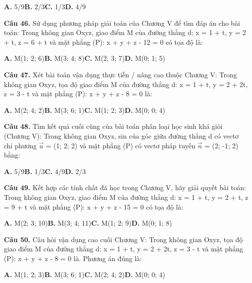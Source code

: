 \documentclass[11pt,a4paper]{article}
\begin{document}
\hspace*{1.5em}\textbf{A.} 5/9\quad\quad \textbf{B.} 2/3\quad\quad \textbf{C.} 1/3\quad\quad \textbf{D.} 4/9\par\vspace{2pt}
\textbf{\color{primary} Câu 46.} Sử dụng phương pháp giải toán của Chương V để tìm đáp án cho bài toán: Trong không gian Oxyz, giao điểm M của đường thẳng d: x = 1 + t, y = 2 + t, z = 6 + t và mặt phẳng (P): x + y + z - 12 = 0 có tọa độ là:\par
\hspace*{1.5em}\textbf{A.} M(1; 2; 6)\quad\quad \textbf{B.} M(3; 4; 8)\quad\quad \textbf{C.} M(2; 3; 7)\quad\quad \textbf{D.} M(0; 1; 5)\par\vspace{2pt}
\textbf{\color{primary} Câu 47.} Xét bài toán vận dụng thực tiễn / nâng cao thuộc Chương V: Trong không gian Oxyz, tọa độ giao điểm M của đường thẳng d: x = 1 + t, y = 2 + 2t, z = 3 - t và mặt phẳng (P): x + y + z - 8 = 0 là:\par
\hspace*{1.5em}\textbf{A.} M(2; 4; 2)\quad\quad \textbf{B.} M(3; 6; 1)\quad\quad \textbf{C.} M(1; 2; 3)\quad\quad \textbf{D.} M(0; 0; 4)\par\vspace{2pt}
\textbf{\color{primary} Câu 48.} Tìm kết quả cuối cùng của bài toán phân loại học sinh khá giỏi (Chương V): Trong không gian Oxyz, sin của góc giữa đường thẳng d có vectơ chỉ phương $\vec{u}$ = (1; 2; 2) và mặt phẳng (P) có vectơ pháp tuyến $\vec{n}$ = (2; -1; 2) bằng:\par
\hspace*{1.5em}\textbf{A.} 5/9\quad\quad \textbf{B.} 1/3\quad\quad \textbf{C.} 4/9\quad\quad \textbf{D.} 2/3\par\vspace{2pt}
\textbf{\color{primary} Câu 49.} Kết hợp các tính chất đã học trong Chương V, hãy giải quyết bài toán: Trong không gian Oxyz, giao điểm M của đường thẳng d: x = 1 + t, y = 2 + t, z = 9 + t và mặt phẳng (P): x + y + z - 15 = 0 có tọa độ là:\par
\hspace*{1.5em}\textbf{A.} M(2; 3; 10)\quad\quad \textbf{B.} M(3; 4; 11)\quad\quad \textbf{C.} M(1; 2; 9)\quad\quad \textbf{D.} M(0; 1; 8)\par\vspace{2pt}
\textbf{\color{primary} Câu 50.} Câu hỏi vận dụng cao cuối Chương V: Trong không gian Oxyz, tọa độ giao điểm M của đường thẳng d: x = 1 + t, y = 2 + 2t, z = 3 - t và mặt phẳng (P): x + y + z - 8 = 0 là. Phương án đúng là:\par
\hspace*{1.5em}\textbf{A.} M(1; 2; 3)\quad\quad \textbf{B.} M(3; 6; 1)\quad\quad \textbf{C.} M(2; 4; 2)\quad\quad \textbf{D.} M(0; 0; 4)\par\vspace{2pt}
\end{document}
